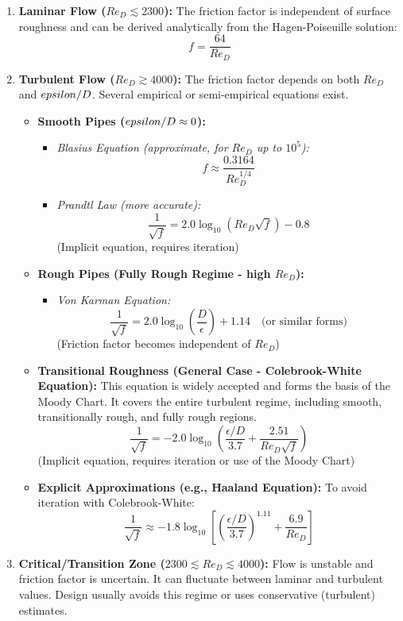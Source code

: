 \begin{enumerate}
\def\labelenumi{\arabic{enumi}.}
\item
  \textbf{Laminar Flow (\(Re_D \lesssim 2300\)):} The friction factor is
  independent of surface roughness and can be derived analytically from
  the Hagen-Poiseuille solution: \[ \boxed{ f = \frac{64}{Re_D} } \]
\item
  \textbf{Turbulent Flow (\(Re_D \gtrsim 4000\)):} The friction factor
  depends on both \(Re_D\) and \(\\epsilon/D\). Several empirical or
  semi-empirical equations exist.

  \begin{itemize}
  \tightlist
  \item
    \textbf{Smooth Pipes (\(\\epsilon/D \approx 0\)):}

    \begin{itemize}
    \tightlist
    \item
      \emph{Blasius Equation (approximate, for \(Re_D\) up to
      \(10^5\)):} \[ f \approx \frac{0.3164}{Re_D^{1/4}} \]
    \item
      \emph{Prandtl Law (more accurate):}
      \[ \frac{1}{\sqrt{f}} = 2.0 \log_{10}(Re_D \sqrt{f}) - 0.8 \]
      (Implicit equation, requires iteration)
    \end{itemize}
  \item
    \textbf{Rough Pipes (Fully Rough Regime - high \(Re_D\)):}

    \begin{itemize}
    \tightlist
    \item
      \emph{Von Karman Equation:}
      \[ \frac{1}{\sqrt{f}} = 2.0 \log_{10}\left(\frac{D}{\epsilon}\right) + 1.14 \quad \text{(or similar forms)} \]
      (Friction factor becomes independent of \(Re_D\))
    \end{itemize}
  \item
    \textbf{Transitional Roughness (General Case - Colebrook-White
    Equation):} This equation is widely accepted and forms the basis of
    the Moody Chart. It covers the entire turbulent regime, including
    smooth, transitionally rough, and fully rough regions.
    \[ \boxed{ \frac{1}{\sqrt{f}} = -2.0 \log_{10}\left( \frac{\epsilon/D}{3.7} + \frac{2.51}{Re_D \sqrt{f}} \right) } \]
    (Implicit equation, requires iteration or use of the Moody Chart)
  \item
    \textbf{Explicit Approximations (e.g., Haaland Equation):} To avoid
    iteration with Colebrook-White:
    \[ \boxed{ \frac{1}{\sqrt{f}} \approx -1.8 \log_{10}\left[ \left(\frac{\epsilon/D}{3.7}\right)^{1.11} + \frac{6.9}{Re_D} \right] } \]
  \end{itemize}
\item
  \textbf{Critical/Transition Zone
  (\(2300 \lesssim Re_D \lesssim 4000\)):} Flow is unstable and friction
  factor is uncertain. It can fluctuate between laminar and turbulent
  values. Design usually avoids this regime or uses conservative
  (turbulent) estimates.
\end{enumerate}

